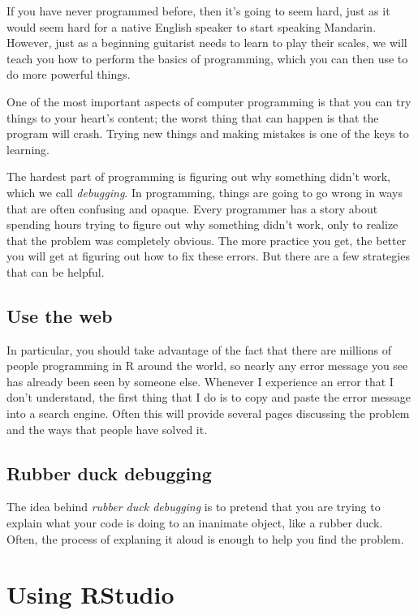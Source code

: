\documentclass[12pt,]{book}
\begin{document}
If you have never programmed before, then it's going to seem hard, just as it would seem hard for a native English speaker to start speaking Mandarin. However, just as a beginning guitarist needs to learn to play their scales, we will teach you how to perform the basics of programming, which you can then use to do more powerful things.

One of the most important aspects of computer programming is that you can try things to your heart's content; the worst thing that can happen is that the program will crash. Trying new things and making mistakes is one of the keys to learning.

The hardest part of programming is figuring out why something didn't work, which we call \emph{debugging}. In programming, things are going to go wrong in ways that are often confusing and opaque. Every programmer has a story about spending hours trying to figure out why something didn't work, only to realize that the problem was completely obvious. The more practice you get, the better you will get at figuring out how to fix these errors. But there are a few strategies that can be helpful.

\hypertarget{use-the-web}{%
\subsection{Use the web}\label{use-the-web}}

In particular, you should take advantage of the fact that there are millions of people programming in R around the world, so nearly any error message you see has already been seen by someone else. Whenever I experience an error that I don't understand, the first thing that I do is to copy and paste the error message into a search engine. Often this will provide several pages discussing the problem and the ways that people have solved it.

\hypertarget{rubber-duck-debugging}{%
\subsection{Rubber duck debugging}\label{rubber-duck-debugging}}

The idea behind \emph{rubber duck debugging} is to pretend that you are trying to explain what your code is doing to an inanimate object, like a rubber duck. Often, the process of explaning it aloud is enough to help you find the problem.

\hypertarget{using-rstudio}{%
\section{Using RStudio}\label{using-rstudio}}
\end{document}
